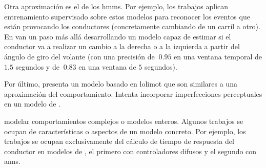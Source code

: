 Otra aproximación es el de los \glspl{hmm}. Por ejemplo, los trabajos \cite{Kuge2000,sekizawa2007modeling} aplican entrenamiento supervisado sobre estos modelos para reconocer los eventos que están provocando los conductores (concretamente cambiando de un carril a otro). En \cite{Hou2011} van un paso más allá desarrollando un modelo capaz de estimar si el conductor va a realizar un cambio a la derecha o a la izquierda a partir del ángulo de giro del volante (con una precisión de $~0.95$ en una ventana temporal de $1.5$ segundos y de $~0.83$ en una ventana de $5$ segundos).

Por último, \cite{Aghabayk2013} presenta un modelo basado en \gls{lolimot} que son similares a una aproximación \textit{} del comportamiento. Intenta incorporar imperfecciones perceptuales en un modelo de \textit{}.

 modelar comportamientos complejos o modelos enteros. Algunos trabajos se ocupan de características o aspectos de un modelo concreto. Por ejemplo, los trabajos \cite{Hatipkarasulu2002, zheng2013} se ocupan exclusivamente del cálculo de tiempo de respuesta del conductor en modelos de \textit{}, el primero con controladores difusos y el segundo con \glspl{ann}.